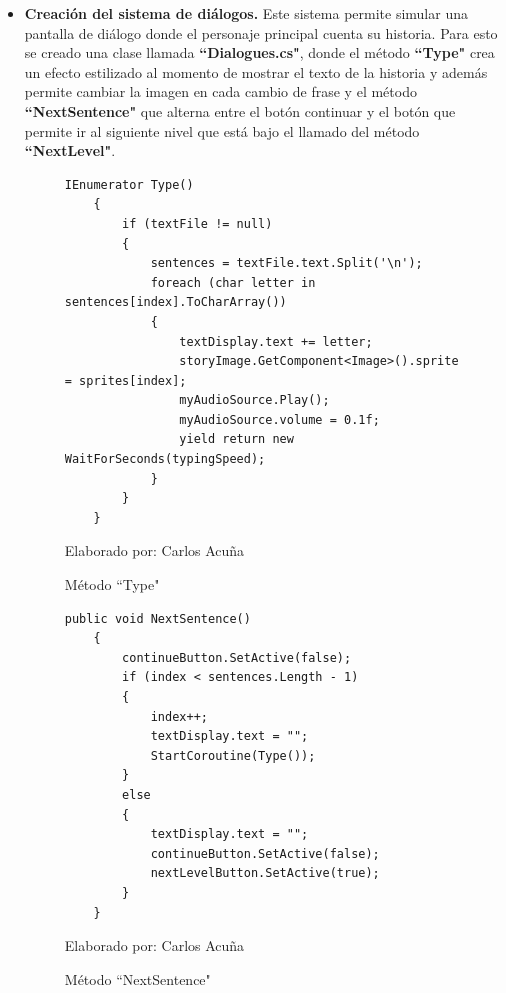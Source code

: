 \documentclass[a4paper, openright, 12pt]{report}
\begin{document}
\begin{itemize}
\item \textbf{Creación del sistema de diálogos.} Este sistema permite simular una pantalla de diálogo donde el personaje principal cuenta su historia. Para esto se creado una clase llamada \textbf{``Dialogues.cs"}, donde el método \textbf{``Type"} crea un efecto estilizado al momento de mostrar el texto de la historia y además permite cambiar la imagen en cada cambio de frase y el método \textbf{``NextSentence"} que alterna entre el botón continuar y el botón que permite ir al siguiente nivel que está bajo el llamado del método \textbf{``NextLevel"}.

\begin{figure}[!]
\captionsetup{justification=centering,margin=2cm}
\centering
\lstset{language=C, breaklines=true, basicstyle=\footnotesize}
\lstset{numbers=left, numberstyle=\tiny, stepnumber=1, numbersep=-2pt}
\captionsetup{justification=centering,margin=2cm}
\begin{lstlisting}[frame=single]
    IEnumerator Type()
    {
        if (textFile != null)
        {
            sentences = textFile.text.Split('\n');
            foreach (char letter in sentences[index].ToCharArray())
            {
                textDisplay.text += letter;
                storyImage.GetComponent<Image>().sprite = sprites[index];                
                myAudioSource.Play();
                myAudioSource.volume = 0.1f;
                yield return new WaitForSeconds(typingSpeed);
            }
        }
    }
\end{lstlisting}
\caption{Método ``Type"}
Elaborado por: Carlos Acuña
\end{figure}

\begin{figure}[!]
\captionsetup{justification=centering,margin=2cm}
\centering
\lstset{language=C, breaklines=true, basicstyle=\footnotesize}
\lstset{numbers=left, numberstyle=\tiny, stepnumber=1, numbersep=-2pt}
\captionsetup{justification=centering,margin=2cm}
\begin{lstlisting}[frame=single]
    public void NextSentence()
    {
        continueButton.SetActive(false);
        if (index < sentences.Length - 1)
        {
            index++;
            textDisplay.text = "";
            StartCoroutine(Type());
        }
        else
        {
            textDisplay.text = "";
            continueButton.SetActive(false);
            nextLevelButton.SetActive(true);
        }
    }
\end{lstlisting}
\caption{Método ``NextSentence"}
Elaborado por: Carlos Acuña
\end{figure}


\end{itemize}
\end{document}
